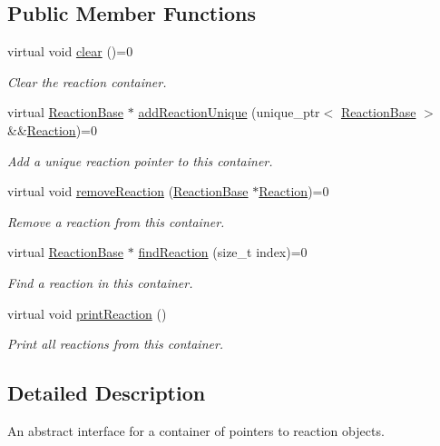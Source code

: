 \subsection*{Public Member Functions}
\begin{DoxyCompactItemize}
\item 
virtual void \hyperlink{classReactionPtrContainerIFace_a5dd8042a6ac1857ee5f6288fa4353f62}{clear} ()=0
\begin{DoxyCompactList}\small\item\em Clear the reaction container. \end{DoxyCompactList}\item 
virtual \hyperlink{classReactionBase}{Reaction\+Base} $\ast$ \hyperlink{classReactionPtrContainerIFace_a8e86b4bf36e244100f07dceff78a98ef}{add\+Reaction\+Unique} (unique\+\_\+ptr$<$ \hyperlink{classReactionBase}{Reaction\+Base} $>$ \&\&\hyperlink{classReaction}{Reaction})=0
\begin{DoxyCompactList}\small\item\em Add a unique reaction pointer to this container. \end{DoxyCompactList}\item 
virtual void \hyperlink{classReactionPtrContainerIFace_ac55d5efa31863e2c82ed2f60d98ba92f}{remove\+Reaction} (\hyperlink{classReactionBase}{Reaction\+Base} $\ast$\hyperlink{classReaction}{Reaction})=0
\begin{DoxyCompactList}\small\item\em Remove a reaction from this container. \end{DoxyCompactList}\item 
virtual \hyperlink{classReactionBase}{Reaction\+Base} $\ast$ \hyperlink{classReactionPtrContainerIFace_a029c99837491d250f2927bdb39a871ca}{find\+Reaction} (size\+\_\+t index)=0
\begin{DoxyCompactList}\small\item\em Find a reaction in this container. \end{DoxyCompactList}\item 
virtual void \hyperlink{classReactionPtrContainerIFace_a9a0ee050b8dec4b0fbac25dac87b7653}{print\+Reaction} ()
\begin{DoxyCompactList}\small\item\em Print all reactions from this container. \end{DoxyCompactList}\end{DoxyCompactItemize}


\subsection{Detailed Description}
An abstract interface for a container of pointers to reaction objects. 

